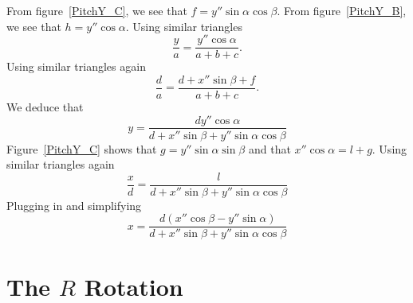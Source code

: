 \begin{SCfigure}[1][htbp]
    \centering
     
    \label{PitchY_A}
    \caption{A diagram of a plane that has been 
    rotate by angle $\beta$ about the $\hat y$ axis 
    and then by $\alpha$ around the $\hat x'$ axis.}
\end{SCfigure}

\begin{SCfigure}[1][htbp]
    \centering
     
    \label{PitchY_B}
    \caption{A more geometrical diagram
    of the figure in figure~\ref{PitchY_A}.}
\end{SCfigure}

\begin{SCfigure}[1][htbp]
    \centering
     
    \label{PitchY_C}
    \caption{A cross section of the $y=0$ plane.}

\end{SCfigure}

From figure~\ref{PitchY_C}, we see  
that $f=y''\sin\alpha\cos\beta$. From figure~\ref{PitchY_B},
we see that $h=y''\cos\alpha$. Using similar
triangles
\begin{equation}
    \frac{y}{a} = \frac{y''\cos\alpha}{a+b+c}.
\end{equation}
Using similar triangles again
\begin{equation}
    \frac{d}{a} = \frac{d+x''\sin\beta+f}{a+b+c}.
\end{equation}
We deduce that
\begin{equation}\label{ytermsydoubleprime}
    \boxed{y=\frac{dy''\cos\alpha}{
    d+x''\sin\beta+y''\sin\alpha\cos\beta}}
\end{equation}
Figure~\ref{PitchY_C} shows that 
$g=y''\sin\alpha\sin\beta$ and that 
$x''\cos\alpha=l+g$. Using similar triangles again 
\begin{equation}
    \frac{x}{d} = \frac{l}{d+x''\sin\beta+
    y''\sin\alpha\cos\beta}
\end{equation}
Plugging in and simplifying
\begin{equation}\label{xtermsxdoubleprime}
    \boxed{x=\frac{d(x''\cos\beta-y''\sin\alpha)}{
    d+x''\sin\beta+y''\sin\alpha\cos\beta}}
\end{equation}

\section{\texorpdfstring{The $R$ Rotation}{The R Rotation}}

